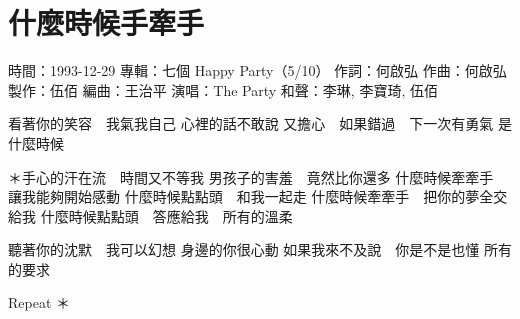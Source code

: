 \documentclass[UTF8,a4paper,oneside,twocolumn,12pt]{ctexbook}
\newcommand{\infopair}[2]{\textbullet #1：#2}
\newcommand{\zc}[1][伍佰]{\infopair{作詞}{#1}}
\newcommand{\zq}[1][伍佰]{\infopair{作曲}{#1}}
\newcommand{\bq}[1][伍佰]{\infopair{編曲}{#1}}
\newcommand{\zj}[1]{\infopair{專輯}{#1}}
\newcommand{\zz}[1]{\infopair{製作}{#1}}
\newcommand{\sj}[1]{\infopair{時間}{#1}}
\newenvironment{info}{\begin{flushleft}\kaishu
	}
	{\end{flushleft}\normalsize\yahei\par}
\newenvironment{lyric}{
	}
{}
\begin{document}
\section{什麼時候手牽手}
\begin{info}
	\sj{1993-12-29}
	\zj{七個 Happy Party（5/10）}
	\zc[何啟弘]
	\zq[何啟弘]
	\zz{伍佰}
	\bq[王治平]
	\infopair{演唱}{The Party}
	\infopair{和聲}{李琳, 李寶琦, 伍佰}
\end{info}
\begin{lyric}
	看著你的笑容　我氣我自己
	心裡的話不敢說
	又擔心　如果錯過　下一次有勇氣
	是什麼時候

	＊手心的汗在流　時間又不等我
	男孩子的害羞　竟然比你還多
	什麼時候牽牽手　讓我能夠開始感動
	什麼時候點點頭　和我一起走
	什麼時候牽牽手　把你的夢全交給我
	什麼時候點點頭　答應給我　所有的溫柔

	聽著你的沈默　我可以幻想
	身邊的你很心動
	如果我來不及說　你是不是也懂
	所有的要求

	Repeat ＊
\end{lyric}
\end{document}
